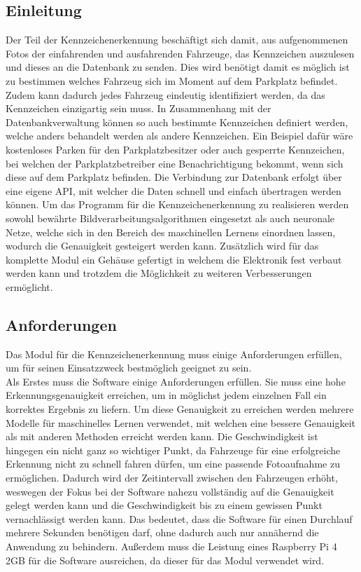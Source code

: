 \def \sectionauthors {Samuel Bleiner}
\subsection{Einleitung}
Der Teil der Kennzeichenerkennung beschäftigt sich damit, aus aufgenommenen Fotos der einfahrenden und ausfahrenden Fahrzeuge, 
das Kennzeichen auszulesen und dieses an die Datenbank zu senden. Dies wird benötigt damit es möglich ist zu bestimmen welches 
Fahrzeug sich im Moment auf dem Parkplatz befindet. Zudem kann dadurch jedes Fahrzeug eindeutig identifiziert werden, da das Kennzeichen 
einzigartig sein muss.  In Zusammenhang mit der Datenbankverwaltung können so auch bestimmte Kennzeichen definiert werden, welche anders 
behandelt werden als andere Kennzeichen. Ein Beispiel dafür wäre kostenloses Parken für den Parkplatzbesitzer oder auch gesperrte Kennzeichen, 
bei welchen der Parkplatzbetreiber eine Benachrichtigung bekommt, wenn sich diese auf dem Parkplatz befinden. Die Verbindung zur Datenbank 
erfolgt über eine eigene API, mit welcher die Daten schnell und einfach übertragen werden können. Um das Programm für die Kennzeichenerkennung 
zu realisieren werden sowohl bewährte Bildverarbeitungsalgorithmen eingesetzt als auch neuronale Netze, welche sich in den Bereich des 
maschinellen Lernens einordnen lassen, wodurch die Genauigkeit gesteigert werden kann. Zusätzlich wird für das komplette Modul ein Gehäuse 
gefertigt in welchem die Elektronik fest verbaut werden kann und trotzdem die Möglichkeit zu weiteren Verbesserungen ermöglicht.

\subsection{Anforderungen}
Das Modul für die Kennzeichenerkennung muss einige Anforderungen erfüllen, um für seinen Einsatzzweck bestmöglich geeignet zu sein.\\

Als Erstes muss die Software einige Anforderungen erfüllen. Sie muss eine hohe Erkennungsgenauigkeit erreichen, um in möglichst jedem einzelnen Fall 
ein korrektes Ergebnis zu liefern. Um diese Genauigkeit zu erreichen werden mehrere Modelle für maschinelles Lernen verwendet, mit welchen 
eine bessere Genauigkeit als mit anderen Methoden erreicht werden kann. Die Geschwindigkeit ist hingegen ein nicht ganz so wichtiger Punkt, 
da Fahrzeuge für eine erfolgreiche Erkennung nicht zu schnell fahren dürfen, um eine passende Fotoaufnahme zu ermöglichen. Dadurch wird der 
Zeitintervall zwischen den Fahrzeugen erhöht, weswegen der Fokus bei der Software nahezu vollständig auf die Genauigkeit gelegt werden kann 
und die Geschwindigkeit bis zu einem gewissen Punkt vernachlässigt werden kann. Das bedeutet, dass die Software für einen Durchlauf mehrere 
Sekunden benötigen darf, ohne dadurch auch nur annähernd die Anwendung zu behindern. Außerdem muss die Leistung eines Raspberry Pi 4 2GB für 
die Software ausreichen, da dieser für das Modul verwendet wird.\\

